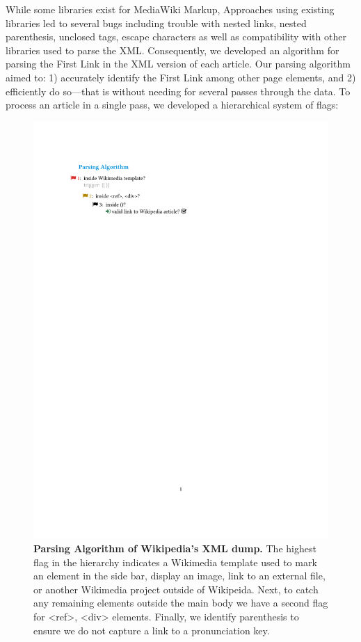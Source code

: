 \documentclass[pre,twocolumn,twoside,superscriptaddress,floatfix, aps, 10pt]{revtex4-1}
\begin{document}
While some libraries exist for MediaWiki Markup,
Approaches using existing libraries led to several bugs 
including trouble with nested links, nested parenthesis, unclosed tags, escape characters 
as well as compatibility with other libraries used to parse the XML.
Consequently,  we developed an algorithm for parsing the First Link in the XML version of each article.
Our parsing algorithm aimed to: 
1) accurately identify the First Link among other page elements, and 
2) efficiently do so---that is without needing for several passes through the data.
To process an article in a single pass, we developed a hierarchical system of flags:
\begin{figure}[tp!]
  \includegraphics[width=\columnwidth]{graphics/flags.pdf}  
  \caption{
    \textbf{Parsing Algorithm of Wikipedia's XML dump.}
The highest flag in the hierarchy indicates a Wikimedia template used to mark an element in the side bar, display an image, link to an external file, or another Wikimedia project outside of Wikipeida. Next, to catch any remaining elements outside the main body we have a second flag for <ref>, <div> elements. Finally, we identify parenthesis to ensure we do not capture a link to a pronunciation key.}
  \label{fig:parsing algorithm}
\end{figure}
\end{document}
